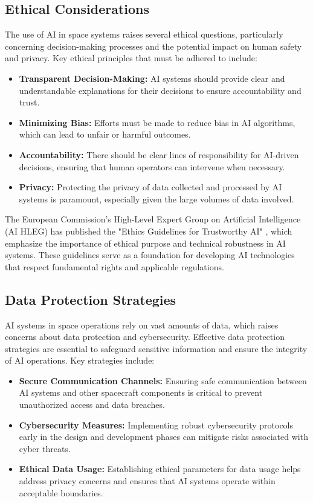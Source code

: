 \documentclass[a4paper, 11pt]{article}
\begin{document}
\subsection{Ethical Considerations}

The use of AI in space systems raises several ethical questions, particularly concerning decision-making processes and the potential impact on human safety and privacy. Key ethical principles that must be adhered to include:

\begin{itemize}
    \item \textbf{Transparent Decision-Making:} AI systems should provide clear and understandable explanations for their decisions to ensure accountability and trust.
    \item \textbf{Minimizing Bias:} Efforts must be made to reduce bias in AI algorithms, which can lead to unfair or harmful outcomes.
    \item \textbf{Accountability:} There should be clear lines of responsibility for AI-driven decisions, ensuring that human operators can intervene when necessary.
    \item \textbf{Privacy:} Protecting the privacy of data collected and processed by AI systems is paramount, especially given the large volumes of data involved.
\end{itemize}

The European Commission's High-Level Expert Group on Artificial Intelligence (AI HLEG) has published the "Ethics Guidelines for Trustworthy AI" \cite{european_commission_2018}, which emphasize the importance of ethical purpose and technical robustness in AI systems. These guidelines serve as a foundation for developing AI technologies that respect fundamental rights and applicable regulations.

\subsection{Data Protection Strategies}

AI systems in space operations rely on vast amounts of data, which raises concerns about data protection and cybersecurity. Effective data protection strategies are essential to safeguard sensitive information and ensure the integrity of AI operations. Key strategies include:

\begin{itemize}
    \item \textbf{Secure Communication Channels:} Ensuring safe communication between AI systems and other spacecraft components is critical to prevent unauthorized access and data breaches.
    \item \textbf{Cybersecurity Measures:} Implementing robust cybersecurity protocols early in the design and development phases can mitigate risks associated with cyber threats.
    \item \textbf{Ethical Data Usage:} Establishing ethical parameters for data usage helps address privacy concerns and ensures that AI systems operate within acceptable boundaries.
\end{itemize}
\end{document}
